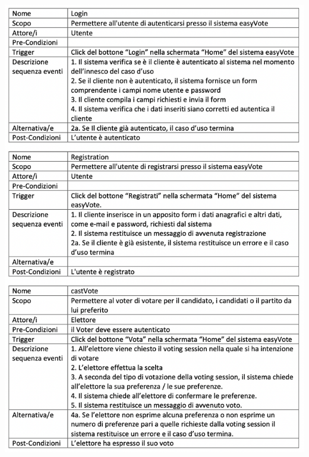 \documentclass[11pt, oneside]{article}   	%
\begin{document}
\begin{center}
\includegraphics[scale=0.9]{images/sceneryDescription.png}

\end{center}
\end{document}
